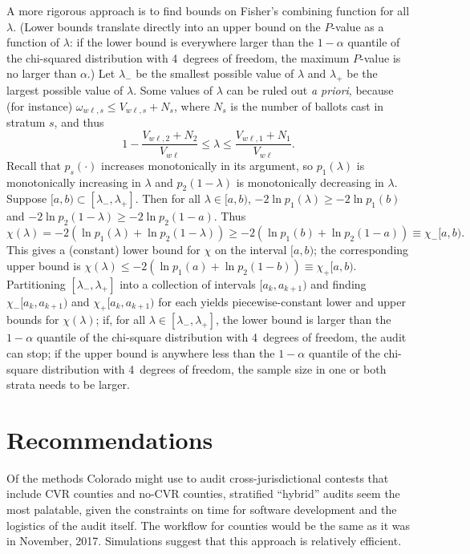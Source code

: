 \documentclass[runningheads]{llncs}
\newcommand{\beq}{\begin{equation}}
\newcommand{\eeq}{\end{equation}}
\begin{document}
A more rigorous approach is to find bounds on Fisher's combining function for all
$\lambda$. 
(Lower bounds translate directly into an upper bound on the $P$-value as a function of
$\lambda$: if the lower bound is 
everywhere larger than the $1-\alpha$ quantile of the chi-squared distribution with 4~degrees of freedom, the maximum $P$-value is no larger than $\alpha$.)
Let $\lambda_-$ be the smallest possible value of $\lambda$ and $\lambda_+$ be the largest
possible value of $\lambda$.
Some values of $\lambda$ can be ruled out \emph{a priori}, because (for instance) $\omega_{w\ell,s} \le
V_{w\ell,s}+N_s$,
where $N_s$ is the number of ballots cast in stratum $s$, and thus
\beq
   1 - \frac{V_{w\ell,2}+N_2}{V_{w\ell}} \le \lambda \le \frac{V_{w\ell,1}+N_1}{V_{w\ell}}.
\eeq
Recall that $p_s(\cdot)$ increases monotonically in its argument, so $p_1(\lambda)$ is
monotonically increasing in $\lambda$ and $p_2(1-\lambda)$ is monotonically decreasing in $\lambda$.
Suppose $[a, b) \subset [\lambda_-, \lambda_+]$.
Then for all $\lambda \in [a, b)$, $-2\ln p_1(\lambda) \ge -2\ln p_1(b)$ and
$-2\ln p_2(1-\lambda) \ge -2\ln p_2(1-a)$.
Thus
\beq
   \chi(\lambda) = -2(\ln p_1(\lambda)+ \ln p_2(1-\lambda))
          \ge -2(\ln p_1(b) + \ln p_2(1-a)) \equiv \chi_-[a,b).
\eeq
This gives a (constant) lower bound for $\chi$ on the interval $[a, b)$; the corresponding 
upper bound is $\chi(\lambda) \le -2(\ln p_1(a) + \ln p_2(1-b)) \equiv \chi_+[a,b)$.
Partitioning $[\lambda_-, \lambda_+]$ into a collection of intervals $[a_k, a_{k+1})$
and finding $\chi_-[a_k, a_{k+1})$ and $\chi_+[a_k, a_{k+1})$ for each
yields piecewise-constant lower and upper bounds for $\chi(\lambda)$; if,
 for all $\lambda \in [\lambda_-, \lambda_+]$, the lower bound
is larger than the $1-\alpha$ quantile of the chi-square distribution with 4~degrees of freedom,
the audit can stop; if the upper bound is anywhere less than the $1-\alpha$ quantile of the chi-square distribution with 4~degrees of freedom, the sample size in one or both strata needs to be larger.

%



\section{Recommendations} \label{sec:recommendations}

Of the methods Colorado might use to audit cross-jurisdictional contests
that include CVR counties and no-CVR counties,
stratified ``hybrid'' audits seem the most palatable,
given the constraints on time for software development and the logistics
of the audit itself. 
The workflow for counties would be the same
as it was in November, 2017.
Simulations suggest that this approach is relatively efficient.
\end{document}
